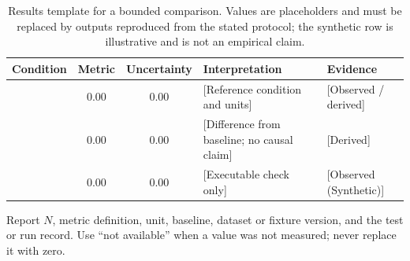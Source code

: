 \documentclass[10pt,a4paper]{article}
\newcommand{\statussynthetic}{Observed (Synthetic)}
\begin{document}
\begin{table}[htbp]
  \centering
  \small
  \caption{Results template for a bounded comparison. Values are placeholders
    and must be replaced by outputs reproduced from the stated protocol; the
  synthetic row is illustrative and is not an empirical claim.}
  \label{tab:results}
  \begin{threeparttable}
    \begin{tabularx}{\linewidth}{l S S X l}
      \toprule
      \textbf{Condition} & {\textbf{Metric}} & {\textbf{Uncertainty}} &
      \textbf{Interpretation} & \textbf{Evidence} \\
      \midrule
      [Baseline] & 0.00 & 0.00 & [Reference condition and units] &
      [Observed / derived] \\
      [Method A] & 0.00 & 0.00 & [Difference from baseline; no causal claim] &
      [Derived] \\
      [Synthetic fixture] & 0.00 & 0.00 & [Executable check only] &
      [\statussynthetic] \\
      \bottomrule
    \end{tabularx}
    \begin{tablenotes}[flushleft]
      \footnotesize
    \item Report $N$, metric definition, unit, baseline, dataset or fixture
      version, and the test or run record. Use ``not available'' when a value
      was not measured; never replace it with zero.
    \end{tablenotes}
  \end{threeparttable}
\end{table}
\end{document}
